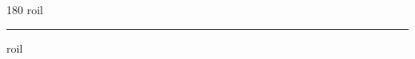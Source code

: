 
\begin{frame}
\begin{center}
\begin{turn}{180}
{\fontsize{2.5cm}{1em}\selectfont roil}
\end{turn}
\vspace{1em}\par  
\hrule
\vspace{1em}\par  
{\fontsize{2.5cm}{1em}\selectfont roil}
\end{center}
\end{frame}
